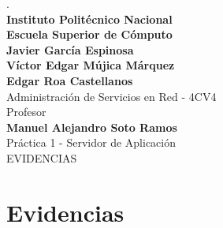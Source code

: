 \documentclass[11pt,a4paper]{report}
\numberwithin{equation}{section}
\begin{document}
\begin{titlepage}
\begin{figure}[!tbp]
\begin{minipage}[b]{0.5\textwidth}
			\end{minipage}
		\end{figure}
		\vspace {0.75cm} 
		\huge{.} \\ [0.2cm]
		\huge{\textbf{Instituto Politécnico Nacional}} \\ [0.75cm]
		\huge{\textbf{Escuela Superior de Cómputo}} \\ [0.75cm]
		\vspace {0.75cm}
		\Large{\textbf{Javier García Espinosa}} \\
		\Large{\textbf{Víctor Edgar Mújica Márquez}} \\
		\Large{\textbf{Edgar Roa Castellanos}} \\
		\Large{Administración de Servicios en Red - 4CV4} \\[0.75cm]
		\Large{Profesor} \\
		\Large{\textbf{Manuel Alejandro Soto Ramos}} \\[0.75cm]
		\Large{Práctica 1 - Servidor de Aplicación} \\ [0.75 cm]
		\Large{EVIDENCIAS} \\ [0.75 cm]
	\end{titlepage}
	\tableofcontents
	\listoffigures
	\lstlistoflistings
	\newpage
	\chapter{Evidencias}
	
\end{document}
